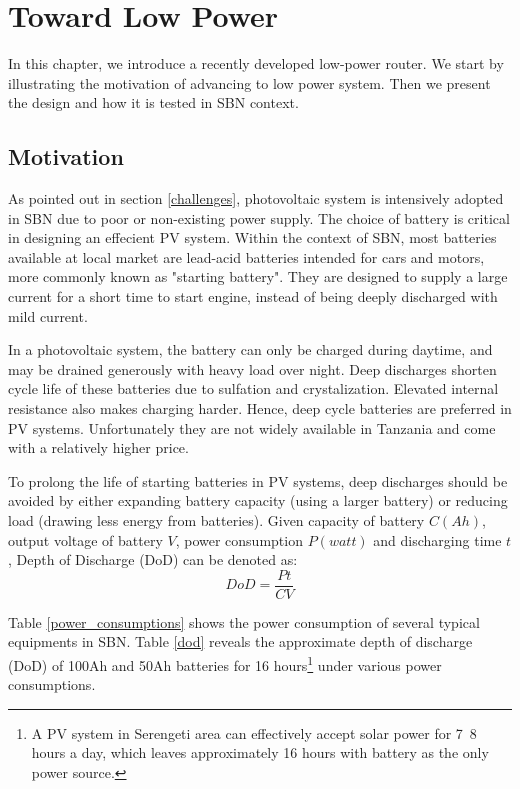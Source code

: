 \chapter{Toward Low Power}
In this chapter, we introduce a recently developed low-power router. We start by illustrating the motivation of advancing to low power system. Then we present the design and how it is tested in SBN context.

\section{Motivation}
As pointed out in section \ref{challenges}, photovoltaic system is intensively adopted in SBN due to poor or non-existing power supply. The choice of battery is critical in designing an effecient PV system. Within the context of SBN, most batteries available at local market are lead-acid batteries intended for cars and motors, more commonly known as "starting battery". They are designed to supply a large current for a short time to start engine, instead of being deeply discharged with mild current.

In a photovoltaic system, the battery can only be charged during daytime, and may be drained generously with heavy load over night. Deep discharges shorten cycle life of these batteries due to sulfation and crystalization. Elevated internal resistance also makes charging harder. Hence, deep cycle batteries are preferred in PV systems. Unfortunately they are not widely available in Tanzania and come with a relatively higher price.

To prolong the life of starting batteries in PV systems, deep discharges should be avoided by either expanding battery capacity (using a larger battery) or reducing load (drawing less energy from batteries). Given capacity of battery $C(Ah)$, output voltage of battery $V$, power consumption $P(watt)$ and discharging time $t$, Depth of Discharge (DoD) can be denoted as:
\begin{equation}
DoD = \frac{Pt}{CV}
\end{equation}

Table \ref{power_consumptions} shows the power consumption of several typical equipments in SBN. Table \ref{dod} reveals the approximate depth of discharge (DoD) of 100Ah and 50Ah batteries for 16 hours\footnote{A PV system in Serengeti area can effectively accept solar power for 7~8 hours a day, which leaves approximately 16 hours with battery as the only power source.} under various power consumptions.

